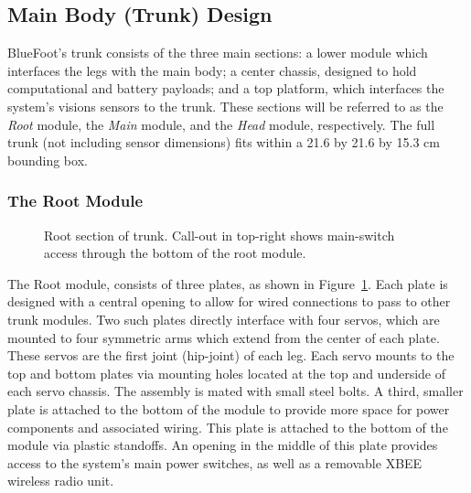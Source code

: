 		\subsection{Main Body (Trunk) Design}
		
			BlueFoot's trunk consists of the three main sections: a lower module which interfaces the legs with the main body; a center chassis, designed to  hold computational and battery payloads; and a top platform, which interfaces the system's visions sensors to the trunk. These sections will be referred to as the \emph{Root} module, the \emph{Main} module, and the \emph{Head} module, respectively. The full trunk (not including sensor dimensions) fits within a 21.6 by 21.6 by 15.3 cm bounding box. 

			\subsubsection{The Root Module}

				\begin{figure}[h!]
					\centering
					\caption{Root section of trunk. Call-out in top-right shows main-switch access through the bottom of the root module.}
					\label{fig::root_module}
				\end{figure}

				The Root module, consists of three plates, as shown in Figure~\ref{fig::root_module}. Each plate is designed with a central opening to allow for wired connections to pass to other trunk modules. Two such plates directly interface with four servos, which are mounted to four symmetric arms which extend from the center of each plate. These servos are the first joint (hip-joint) of each leg. Each servo mounts to the top and bottom plates via mounting holes located at the top and underside of each servo chassis. The assembly is mated with small steel bolts. A third, smaller plate is attached to the bottom of the module to provide more space for power components and associated wiring. This plate is attached to the bottom of the module via plastic standoffs. An opening in the middle of this plate provides access to the system's main power switches, as well as a removable XBEE wireless radio unit.


